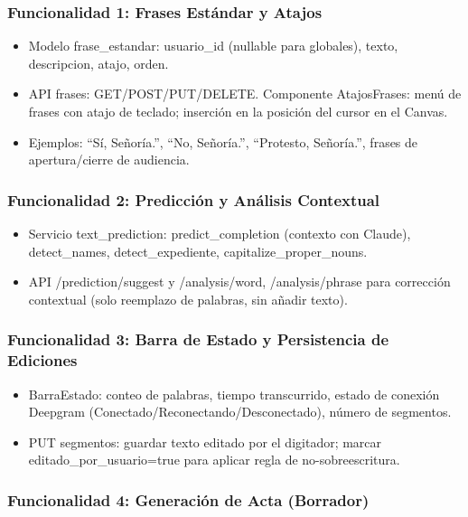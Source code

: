 \documentclass[12pt,a4paper]{report}
\begin{document}
\subsubsection{Funcionalidad 1: Frases Estándar y Atajos}

\begin{itemize}
    \item Modelo frase\_estandar: usuario\_id (nullable para globales), texto, descripcion, atajo, orden.
    \item API frases: GET/POST/PUT/DELETE. Componente AtajosFrases: menú de frases con atajo de teclado; inserción en la posición del cursor en el Canvas.
    \item Ejemplos: ``Sí, Señoría.'', ``No, Señoría.'', ``Protesto, Señoría.'', frases de apertura/cierre de audiencia.
\end{itemize}

\subsubsection{Funcionalidad 2: Predicción y Análisis Contextual}

\begin{itemize}
    \item Servicio text\_prediction: predict\_completion (contexto con Claude), detect\_names, detect\_expediente, capitalize\_proper\_nouns.
    \item API /prediction/suggest y /analysis/word, /analysis/phrase para corrección contextual (solo reemplazo de palabras, sin añadir texto).
\end{itemize}

\subsubsection{Funcionalidad 3: Barra de Estado y Persistencia de Ediciones}

\begin{itemize}
    \item BarraEstado: conteo de palabras, tiempo transcurrido, estado de conexión Deepgram (Conectado/Reconectando/Desconectado), número de segmentos.
    \item PUT segmentos: guardar texto editado por el digitador; marcar editado\_por\_usuario=true para aplicar regla de no-sobreescritura.
\end{itemize}

\subsubsection{Funcionalidad 4: Generación de Acta (Borrador)}
\end{document}
